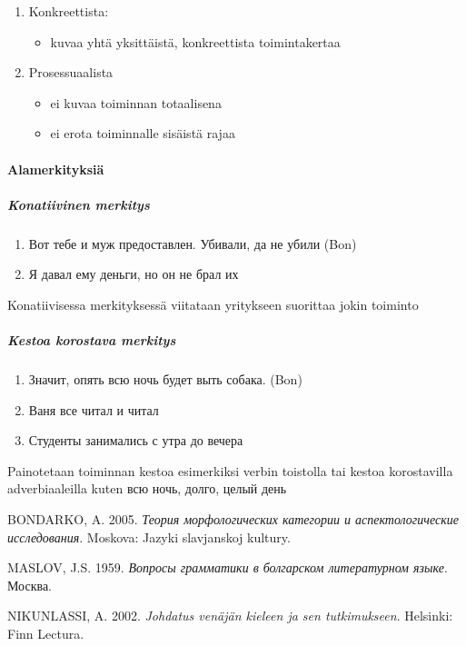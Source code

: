 \documentclass[finnish,russian,]{article}
\begin{document}
\begin{enumerate}
\def\labelenumi{\arabic{enumi}.}
\itemsep1pt\parskip0pt
\item
  Konkreettista:

  \begin{itemize}
  \itemsep1pt\parskip0pt
  \item
    kuvaa yhtä yksittäistä, konkreettista toimintakertaa\\
  \end{itemize}
\item
  Prosessuaalista

  \begin{itemize}
  \itemsep1pt\parskip0pt
  \item
    ei kuvaa toiminnan totaalisena
  \item
    ei erota toiminnalle sisäistä rajaa
  \end{itemize}
\end{enumerate}

\paragraph{Alamerkityksiä}\label{alamerkityksiuxe4}

\subparagraph{Konatiivinen merkitys}\label{konatiivinen-merkitys}

\begin{enumerate}
\def\labelenumi{(\arabic{enumi})}
\setcounter{enumi}{10}
\itemsep1pt\parskip0pt
\item
  Вот тебе и муж предоставлен. Убивали, да не убили (Bon)
\item
  Я давал ему деньги, но он не брал их
\end{enumerate}

Konatiivisessa merkityksessä viitataan yritykseen suorittaa jokin
toiminto

\subparagraph{Kestoa korostava
merkitys}\label{kestoa-korostava-merkitys}

\begin{enumerate}
\def\labelenumi{(\arabic{enumi})}
\setcounter{enumi}{12}
\itemsep1pt\parskip0pt
\item
  Значит, опять всю ночь будет выть собака. (Bon)
\item
  Ваня все читал и читал
\item
  Студенты занимались с утра до вечера
\end{enumerate}

Painotetaan toiminnan kestoa esimerkiksi verbin toistolla tai kestoa
korostavilla adverbiaaleilla kuten всю ночь, долго, целый день

BONDARKO, A. 2005. \emph{Теория морфологических категории и
аспектологические исследования}. Moskova: Jazyki slavjanskoj kultury.

MASLOV, J.S. 1959. \emph{Вопросы грамматики в болгарском литературном
языке}. Москва.

NIKUNLASSI, A. 2002. \emph{Johdatus venäjän kieleen ja sen
tutkimukseen}. Helsinki: Finn Lectura.
\end{document}
